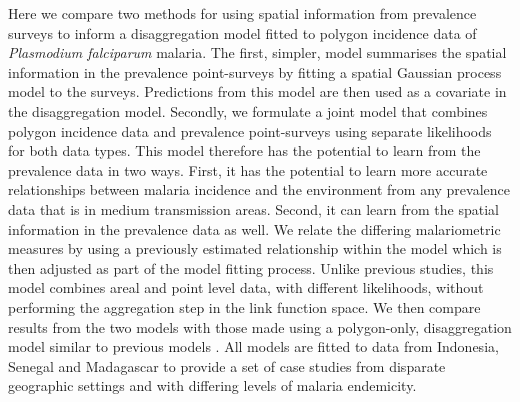 \documentclass{statsoc}
\begin{document}





Here we compare two methods for using spatial information from prevalence surveys to inform a disaggregation model fitted to polygon incidence data of \emph{Plasmodium falciparum}  malaria.
The first, simpler, model summarises the spatial information in the prevalence point-surveys by fitting a spatial Gaussian process model to the surveys.
Predictions from this model are then used as a covariate in the disaggregation model.
Secondly, we formulate a joint model that combines polygon incidence data and prevalence point-surveys using separate likelihoods for both data types.
This model therefore has the potential to learn from the prevalence data in two ways.
First, it has the potential to learn more accurate relationships between malaria incidence and the environment from any prevalence data that is in medium transmission areas. 
Second, it can learn from the spatial information in the prevalence data as well.
We relate the differing malariometric measures by using a previously estimated relationship within the model \citep{cameron2015defining} which is then adjusted as part of the model fitting process.
Unlike previous studies, this model combines areal and point level data, with different likelihoods, without performing the aggregation step in the link function space.
We then compare results from the two models with those made using a polygon-only, disaggregation model similar to previous models \citep{sturrock2014fine, wilson2017pointless}.
All models are fitted to data from Indonesia, Senegal and Madagascar to provide a set of case studies from disparate geographic settings and with differing levels of malaria endemicity.



\end{document}
